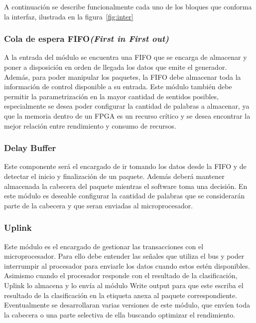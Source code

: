 
A continuación se describe funcionalmente cada uno de los bloques que conforma la interfaz, ilustrada en la figura~\ref{fig:inter}
\subsubsection{Cola de espera FIFO\textit{(First in First out)}}
A la entrada del módulo se encuentra una FIFO que se encarga de almacenar y poner a disposición en orden de llegada los datos que emite el generador. Además, para poder manipular los paquetes, la FIFO debe almacenar toda la información de control disponible a su entrada.
Este módulo también debe permitir la parametrización en la mayor cantidad de sentidos posibles, especialmente se desea poder configurar la cantidad de palabras a almacenar, ya que la memoria dentro de un FPGA es un recurso crítico y se desea encontrar la mejor relación entre rendimiento y consumo de recursos.

\subsubsection{Delay Buffer}
Este componente será el encargado de ir tomando los datos desde la FIFO y de detectar el inicio y finalización de un paquete. Además deberá mantener almacenada la cabecera del paquete mientras el software toma una decisión. En este módulo es deseable configurar la cantidad de palabras que se considerarán parte de la cabecera y que seran enviadas al microprocesador.

\subsubsection{Uplink}
Este módulo es el encargado de gestionar las transacciones con el microprocesador. Para ello debe entender las señales que utiliza el bus y poder interrumpir al procesador para enviarle los datos cuando estos estén disponibles. Asimismo cuando el procesador responde con el resultado de la clasificación, Uplink lo almacena y lo envía al módulo Write output para que este escriba el resultado de la clasificación en la etiqueta anexa al paquete correspondiente.
Eventualmente se desarrollaran varias versiones de este módulo, que envíen toda la cabecera o una parte selectiva de ella buscando optimizar el rendimiento.

